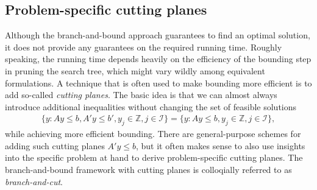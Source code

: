 \documentclass[a4paper]{report}
\theoremstyle{definition}
\theoremstyle{plain}
\begin{document}
\subsection{Problem-specific cutting planes}
Although the branch-and-bound approach guarantees to find an optimal solution, it
does not provide any guarantees on the required running time.
%
Roughly speaking, the running time depends heavily on the efficiency of the
bounding step in pruning the search tree, which might vary wildly among
equivalent formulations.
%
A technique that is often used to make bounding more efficient is to add
so-called \emph{cutting planes}.
%
The basic idea is that we can almost always introduce additional inequalities
without changing the set of feasible solutions
\begin{align}
  \{ y : Ay \leq b, A'y \leq b', y_j \in \mathbb{Z}, j \in \mathcal{I} \} = \{ y : Ay \leq b, y_j \in \mathbb{Z}, j \in \mathcal{I} \} ,
\end{align}
while achieving more efficient bounding.
%
There are general-purpose schemes for adding such cutting planes $A' y \leq b$,
but it often makes sense to also use insights into the specific problem at hand
to derive problem-specific cutting planes.
%
The branch-and-bound framework with cutting planes is colloqially referred to as
\emph{branch-and-cut}.
\end{document}
